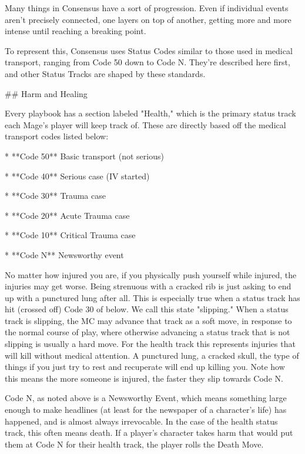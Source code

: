 \documentclass[
  oneside,
  statementpaper,
  9pt]{memoir}
\begin{document}
\begin{Narrator}

Many things in Consensus have a sort of progression. Even if individual events aren’t precisely connected, one layers on top of another, getting more and more intense until reaching a breaking point.

To represent this, Consensus uses Status Codes similar to those used in medical transport, ranging from Code 50 down to Code N. They're described here first, and other Status Tracks are shaped by these standards.

## Harm and Healing

Every playbook has a section labeled "Health," which is the primary status track each Mage's player will keep track of. These are directly based off the medical transport codes listed below:

* **Code 50** Basic transport (not serious)

* **Code 40** Serious case (IV started)

* **Code 30** Trauma case

* **Code 20** Acute Trauma case

* **Code 10** Critical Trauma case

* **Code N** Newsworthy event

No matter how injured you are, if you physically push yourself while injured, the injuries may get worse. Being strenuous with a cracked rib is just asking to end up with a punctured lung after all. This is especially true when a status track has hit (crossed off) Code 30 of below. We call this state "slipping." When a status track is slipping, the MC may advance that track as a soft move, in response to the normal course of play, where otherwise advancing a status track that is not slipping is usually a hard move. For the health track this represents injuries that will kill without medical attention. A punctured lung, a cracked skull, the type of things if you just try to rest and recuperate will end up killing you. Note how this means the more someone is injured, the faster they slip towards Code N.

Code N, as noted above is a Newsworthy Event, which means something large enough to make headlines (at least for the newspaper of a character’s life) has happened, and is almost always irrevocable. In the case of the health status track, this often means death. If a player's character takes harm that would put them at Code N for their health track, the player rolls the Death Move. 

\end{Narrator}
\end{document}
